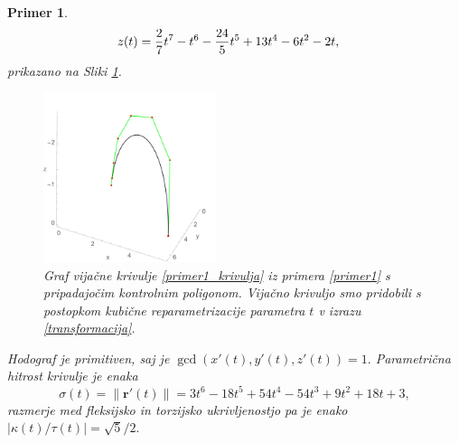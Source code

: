 \documentclass[12pt,a4paper,twoside]{article}
\theoremstyle{definition} %
\theoremstyle{plain} %
\theoremstyle{primerstyle}
\newtheorem{primer}[definicija]{Primer}
\numberwithin{equation}{section}  %
\newcommand{\rV}{\mathbf{r}}
\begin{document}
\begin{primer}
\begin{align}
		z(t)&=\frac{2}{7}t^7-t^6-\frac{24}{5}t^5+13t^4-6t^2-2t,\notag
	\end{align}
	prikazano na Sliki \ref{fig:cubic_reparametrization}.
	\begin{figure}[h!]
	  \centering
	  \includegraphics[width=0.45\textwidth]{images/cubic_reparametrization.pdf}
	  \caption[Primer vijačne krivulje, pridobljene s postopkom kubične reparametrizacije]{Graf vijačne krivulje \eqref{primer1_krivulja} iz primera \ref{primer1} s pripadajočim kontrolnim poligonom. Vijačno krivuljo smo pridobili s postopkom kubične reparametrizacije parametra $t$ v izrazu \eqref{transformacija}.}
	  \label{fig:cubic_reparametrization}
	\end{figure}
	Hodograf je primitiven, saj je $\gcd(x'(t),y'(t),z'(t))=1.$ Parametrična hitrost krivulje je enaka $$\sigma(t)=\lVert\rV'(t)\rVert=3t^6-18t^5+54t^4-54t^3+9t^2+18t+3,$$ razmerje med fleksijsko in torzijsko ukrivljenostjo pa je enako $|\kappa(t)/\tau(t)|=\sqrt{5}/2.$
\end{primer}
\end{document}
